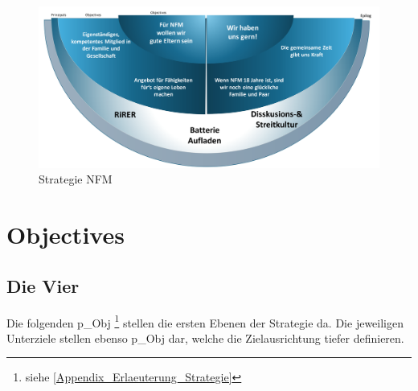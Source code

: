 \begin{figure}[H]
	\centering
	\includegraphics[scale = 0.2]{attachment/chapter_OWN/Scc010.png}
	\caption{Strategie NFM}
\end{figure} 



\pagebreak

\section{Objectives} 

\subsection{Die Vier}

Die folgenden \gls{p_Obj} \footnote{siehe \ref{Appendix_Erlaeuterung_Strategie}} stellen die ersten Ebenen der Strategie da. Die jeweiligen Unterziele stellen ebenso \gls{p_Obj} dar, welche die Zielausrichtung tiefer definieren.

